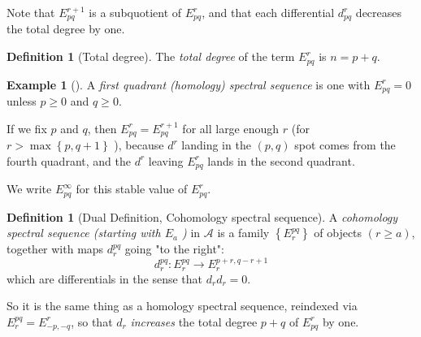\documentclass[reqno]{amsart}
\theoremstyle{definition}
\newtheorem{definition}[theorem]{Definition}
\newtheorem{example}[theorem]{Example}
\theoremstyle{remark}
\begin{document}
Note that $E_{pq}^{r+1}$ is a subquotient of
$E_{pq}^{r}$, and that
each differential $d_{pq}^{r}$ decreases the
total degree by one.

\begin{definition}[Total degree]
    The \textit{total degree} of the term
    $E_{pq}^{r}$ is $n = p+q$.
\end{definition}

\begin{example}[]
    A \textit{first quadrant (homology) spectral sequence}
    is one with $E_{pq}^{r} = 0$ unless
    $p\ge 0$ and $q\ge 0$. 

    If we fix $p$ and $q$, then
    $E_{pq}^{r} = E_{pq}^{r+1}$ for all large
    enough $r$ (for $r> \max \left\{ p,q+1 \right\} $ ), because
    $d^{r}$ landing in the $(p,q)$ spot comes from the fourth
    quadrant, and the $d^{r}$ leaving $E_{pq}^{r}$ lands
    in the second quadrant.

    We write
    $E_{pq}^{\infty}$ for this
    stable value of $E_{pq}^{r}$.
\end{example}

\begin{definition}[Dual Definition, Cohomology spectral sequence]
    A \textit{cohomology spectral sequence (starting with
    $E_a$ )} in $\mathcal{A}$ is a family
    $\left\{ E_r^{pq} \right\} $ of objects $(r\ge a)$, together
    with maps $d_r^{pq}$ going "to the right":
    \[
    d_r^{pq} \colon E_{r}^{pq} \to E_{r}^{p+r,q-r+1}
    \] 
    which are differentials in the sense that
    $d_r d_r = 0$.

    So it is the same thing as a homology
    spectral sequence, reindexed via
    $E_r^{pq} = E_{-p,-q}^{r}$, so
    that $d_r$ \textit{increases} the total degree
    $p+q$ of $E_{pq}^{r}$ by one.
\end{definition}
\end{document}

